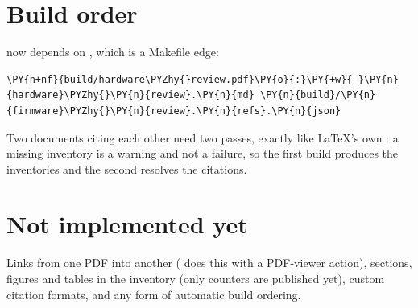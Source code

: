\documentclass[a4paper,twoside]{article}
\begin{document}
\section{Build order}
 now depends on , which is a
Makefile edge:
\begin{tscode}[lang=makefile, engine=pygments]
\begin{Verbatim}[commandchars=\\\{\},breaklines, breakanywhere, commandchars=\\\{\}]
\PY{n+nf}{build/hardware\PYZhy{}review.pdf}\PY{o}{:}\PY{+w}{ }\PY{n}{hardware}\PYZhy{}\PY{n}{review}.\PY{n}{md} \PY{n}{build}/\PY{n}{firmware}\PYZhy{}\PY{n}{review}.\PY{n}{refs}.\PY{n}{json}
\end{Verbatim}
\end{tscode}
Two documents citing each other need two passes, exactly like \LaTeX{}'s own
: a missing inventory is a warning and not a failure, so the first build
produces the inventories and the second resolves the citations.
\section{Not implemented yet}
Links from one PDF into another ( does this with a PDF-viewer 
action), sections, figures and tables in the inventory (only counters are
published yet), custom citation formats, and any form of automatic build
ordering.
\end{document}
